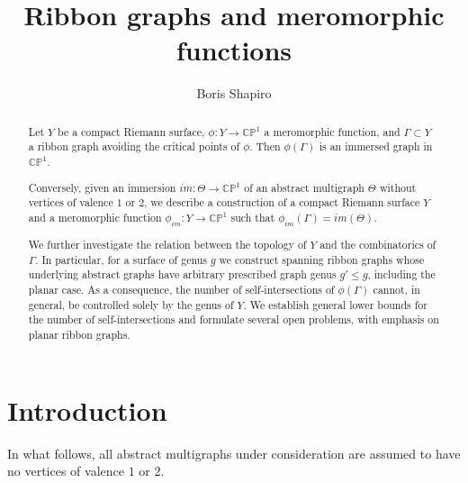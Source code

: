 \documentclass[reqno]{amsart}
\theoremstyle{definition}
\newcommand {\Ga}{\Gamma}
\newcommand {\bCP} {\mathbb {CP}}
\begin{document}

\title[Ribbon graphs and meromorphic functions]{Ribbon graphs and meromorphic functions}


\author[B.~Shapiro]{Boris Shapiro}
\address{Department of Mathematics, Stockholm University, SE-106 91
Stockholm, Sweden}

\date{}

\begin{abstract}
Let $Y$ be a compact Riemann surface, $\phi:Y\to \bCP^1$ a meromorphic function, and $\Ga\subset Y$ a ribbon graph avoiding the critical points of $\phi$. Then $\phi(\Ga)$ is an immersed graph in $\bCP^1$.

Conversely, given an immersion $im:\Theta\to \bCP^1$ of an abstract multigraph $\Theta$ without vertices of valence $1$ or $2$, we describe a construction of a compact Riemann surface $Y$ and a meromorphic function $\phi_{im}:Y\to \bCP^1$   such that $\phi_{im}(\Ga)=im(\Theta)$.

We further investigate the relation between the topology of $Y$ and the combinatorics of $\Ga$. In particular, for a surface of genus $g$ we construct spanning ribbon graphs whose underlying abstract graphs have arbitrary prescribed graph genus $g'\le g$, including the planar case. As a consequence, the number of self-intersections of $\phi(\Ga)$ cannot, in general, be controlled solely by the genus of $Y$. We establish general lower bounds for the number of self-intersections and formulate several open problems, with emphasis on planar ribbon graphs.
\end{abstract}

\maketitle


\section{Introduction}

In what follows, all abstract multigraphs under consideration are assumed to have no vertices of valence $1$ or $2$.
\end{document}
